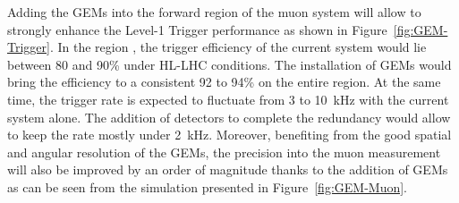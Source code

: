 	Adding the GEMs into the forward region of the muon system will allow to strongly enhance the Level-1 Trigger performance as shown in Figure~\ref{fig:GEM-Trigger}. In the region , the trigger efficiency of the current system would lie between 80 and 90\% under HL-LHC conditions. The installation of GEMs would bring the efficiency to a consistent 92 to 94\% on the entire region. At the same time, the trigger rate is expected to fluctuate from 3 to \SI{10}{kHz} with the current system alone. The addition of detectors to complete the redundancy would allow to keep the rate mostly under \SI{2}{kHz}. Moreover, benefiting from the good spatial and angular resolution of the GEMs, the precision into the muon measurement will also be improved by an order of magnitude thanks to the addition of GEMs as can be seen from the simulation presented in Figure~\ref{fig:GEM-Muon}. 

